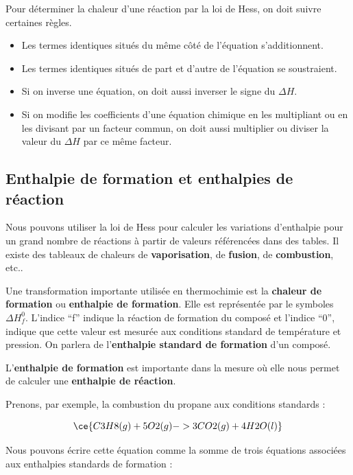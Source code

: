 \documentclass[
  11pt,
  french,
  a4paper,
  openany]{book}
\providecommand{\tightlist}{%
  \setlength{\itemsep}{0pt}\setlength{\parskip}{0pt}}
\begin{document}
Pour déterminer la chaleur d'une réaction par la loi de Hess, on doit suivre certaines règles.

\begin{itemize}
\tightlist
\item
  Les termes identiques situés du même côté de l'équation s'additionnent.
\item
  Les termes identiques situés de part et d'autre de l'équation se soustraient.
\item
  Si on inverse une équation, on doit aussi inverser le signe du \(\Delta H\).
\item
  Si on modifie les coefficients d'une équation chimique en les multipliant ou en les divisant par un facteur commun, on doit aussi multiplier ou diviser la valeur du \(\Delta H\) par ce même facteur.
\end{itemize}

\hypertarget{enthalpie-de-formation-et-enthalpies-de-ruxe9action}{%
\subsection{Enthalpie de formation et enthalpies de réaction}\label{enthalpie-de-formation-et-enthalpies-de-ruxe9action}}

Nous pouvons utiliser la loi de Hess pour calculer les variations d'enthalpie pour un grand nombre de réactions à partir de valeurs référencées dans des tables. Il existe des tableaux de chaleurs de \textbf{vaporisation}, de \textbf{fusion}, de \textbf{combustion}, etc..

Une transformation importante utilisée en thermochimie est la \textbf{chaleur de formation} ou \textbf{enthalpie de formation}. Elle est représentée par le symboles \(\Delta H^{0}_{f}\). L'indice ``f'' indique la réaction de formation du composé et l'indice ``0'', indique que cette valeur est mesurée aux conditions standard de température et pression. On parlera de l'\textbf{enthalpie standard de formation} d'un composé.

L'\textbf{enthalpie de formation} est importante dans la mesure où elle nous permet de calculer une \textbf{enthalpie de réaction}.


Prenons, par exemple, la combustion du propane aux conditions standards :

\[
\ce{C3H8(g) + 5 O2(g) -> 3 CO2(g) + 4 H2O(l)}
\]

Nous pouvons écrire cette équation comme la somme de trois équations associées aux enthalpies standards de formation :
\end{document}
